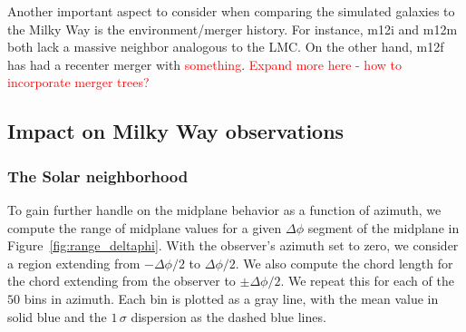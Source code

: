 \documentclass[twocolumn]{aastex62}
\newcommand{\Gus}[1]{\textcolor{red}{#1}}
\begin{document}
Another important aspect to consider when comparing the simulated galaxies to
the Milky Way is the environment/merger history. For instance, m12i and m12m
both lack a massive neighbor analogous to the LMC. On the other hand, m12f has
had a recenter merger with \Gus{something}. \Gus{Expand more here - how to
incorporate merger trees?}

\subsection{Impact on Milky Way observations} \label{ssec:impact_on_mw}
\subsubsection{The Solar neighborhood} \label{sssec:neighborhood}
To gain further handle on the midplane behavior as a function of azimuth, we
compute the range of midplane values for a given $\Delta \phi$ segment of the
midplane in Figure~\ref{fig:range_deltaphi}. With the observer's azimuth set
to zero, we consider a region extending from $-\Delta \phi/2$ to
$\Delta\phi/2$. We also compute the chord length for the chord extending from
the observer to $\pm \Delta\phi/2$. We repeat this for each of the $50$ bins
in azimuth. Each bin is plotted as a gray line, with the mean value in solid
blue and the $1\,\sigma$ dispersion as the dashed blue lines.

\begin{figure*}
\caption{A cartoon explanation of Figure~\ref{fig:range_deltaphi}. An observer
is placed at the blue x in the plane of a backgrround galaxy (lime). For a
given $\Delta \phi$ (blue) centered on the observer, we record the range of
midplane values for this section of the Solar circle (orange). We plot the
value of the range against the value of $\Delta \phi$. We are also able to
convert the value of $\Delta \phi$ into a chord length (pink), which we plot
as a secondary, upper $x$-axis. We repeat the procedure for each initial
$\phi$ (gray lines), and also compute the mean and $\pm1\,\sigma$ values (dark
blue).}
\label{fig:fig_to_explain}
\end{figure*}

\begin{figure*}
\caption{The range of midplane heights encountered as a function of angular
width. At each angle $\phi$ from Figure~\ref{fig:midplane} we consider an
angular width of $\Delta \phi$ centered on $\phi$ and report the range of
midplane heights within that width. We repeat the procedure for each $\phi$
and plot the result as translucent gray lines. We also plot the mean range as
a solid blue line and the $\pm1\sigma$ lines as dashed blue lines. The upper
$x$-axis shows the chord length from the position $\phi$ to $\pm\Delta\phi/2$.
A cartoon explanation of this Figure is given in
Figure~\ref{fig:fig_to_explain}.}
\label{fig:range_deltaphi}
\end{figure*}
\end{document}
